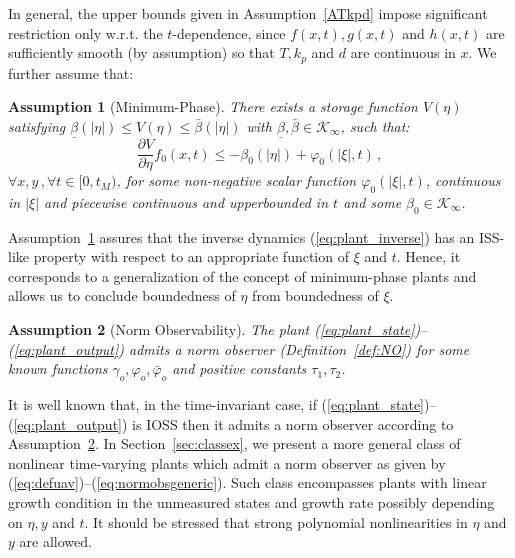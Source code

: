 \documentclass{rncauth}
\newtheorem{assumption}{Assumption}
\begin{document}
In general, the upper bounds given in Assumption~\ref{ATkpd}
impose significant restriction only w.r.t. the $t$-dependence,
since $f(x,t),g(x,t)$ and $h(x,t)$ are sufficiently smooth (by
assumption) so that $T,k_p$ and $d$ are continuous in $x$.
We further assume that:
%
\begin{assumption}[Minimum-Phase]\label{A0}
There exists a storage function $V(\eta)$ satisfying
$\underline{\beta}(|\eta|) \!\leq\!
V(\eta)\!\leq\!\bar{\beta}(|\eta|)$ with
$\underline{\beta},\bar{\beta}\in \mathcal{K}_\infty$, such that:
%
$$\frac{\partial V}{\partial \eta} f_0(x,t) \leq -\beta_0(|\eta|)+\varphi_0(|\xi|,t)\,,$$
%
$\forall x,y\,, \forall t \in [0,t_M)$, for some non-negative
scalar function $\varphi_0(|\xi|,t)$, continuous in $|\xi|$ and
piecewise continuous and upperbounded in $t$ and some $\beta_0\in
\mathcal{K}_\infty$.
\end{assumption}
%
Assumption~\ref{A0} assures that the inverse dynamics
(\ref{eq:plant_inverse}) has an ISS-like property with respect to
an appropriate function of $\xi$ and $t$. Hence, it corresponds to
a generalization of the concept of minimum-phase plants and allows
us to conclude boundedness of $\eta$ from boundedness of $\xi$.
\begin{assumption}[Norm
Observability]\label{ANO} The plant
(\ref{eq:plant_state})--(\ref{eq:plant_output}) admits a norm
observer (Definition~\ref{def:NO}) for some {\em known} functions
$\gamma_o,\varphi_o,\bar{\varphi}_o$ and positive constants
$\tau_1,\tau_2$.
\end{assumption}
%
It is well known that, in the time-invariant case, if
(\ref{eq:plant_state})--(\ref{eq:plant_output}) is IOSS
\cite{SW:97} then it admits a norm observer according to
Assumption~\ref{ANO}.
%
In Section~\ref{sec:classex}, we present a more general class of
nonlinear time-varying plants which admit a norm observer as given
by (\ref{eq:defuav})--(\ref{eq:normobsgeneric}).
Such class encompasses plants with linear growth condition in the
unmeasured states and growth rate possibly depending on $\eta,y$
and $t$. It should be stressed that strong polynomial
nonlinearities in $\eta$ and $y$ are
allowed.%
\end{document}
